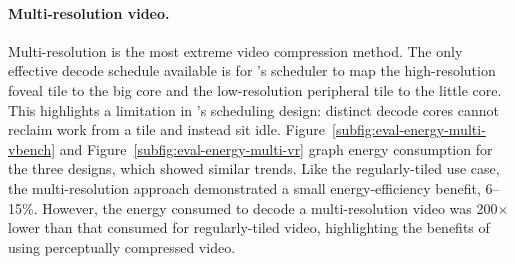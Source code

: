 \paragraph{Multi-resolution video. }Multi-resolution is the most extreme video compression method.
The only effective decode schedule available is for \nameArch's scheduler to map the high-resolution foveal tile to the big core and the low-resolution peripheral tile to the little core.
This highlights a limitation in \nameArch's scheduling design: distinct decode cores cannot reclaim work from a tile and instead sit idle.
Figure~\ref{subfig:eval-energy-multi-vbench} and Figure~\ref{subfig:eval-energy-multi-vr} graph energy consumption for the three designs, which showed similar trends.
Like the regularly-tiled use case, the multi-resolution approach demonstrated a small energy-efficiency benefit, 6--15\%.
However, the energy consumed to decode a multi-resolution video was 200$\times$ lower than that consumed for regularly-tiled video, highlighting the benefits of using perceptually compressed video.
